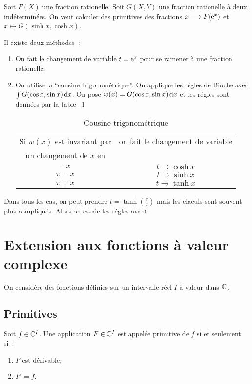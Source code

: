 Soit \(F(X)\) une fraction rationelle. Soit \(G(X,Y)\) une fraction rationelle à deux indéterminées. On veut calculer des primitives des fractions \(x \longmapsto F(\operatorname{e}^x)\) et \(x \longmapsto G(\sinh x,\cosh x)\).

Il existe deux méthodes~:
\begin{enumerate}
  \item On fait le changement de variable \(t=\operatorname{e}^x\) pour se ramener à une fraction rationelle;
  \item On utilise la ``cousine trigonométrique''. On applique les régles de Bioche avec \(\int G(\cos x,\sin x)\mathop{}\mathopen{}\mathrm{d} x\). On pose \(w(x) = G(\cos x,\sin x) \mathop{}\mathopen{}\mathrm{d} x\) et les régles sont données par la table~
    \ref{tab:cousinetrigo}

    \begin{table}[!h]
      \centering
      \begin{tabular}{|c|c|}\hline
        Si \(w(x)\) est invariant par & on fait le changement de variable \\
        un changement de \(x\) en &  \\ \hline
        \(-x\) & \(t \to \cosh x\)\\
        \(\pi-x\) & \(t \to \sinh x\)\\
        \(\pi+x\) & \(t \to \tanh x\)\\
      \hline\end{tabular}
      \caption{Cousine trigonométrique}
      \label{tab:cousinetrigo}
    \end{table}
\end{enumerate}

Dans tous les cas, on peut prendre \(t=\tanh\left(\frac{x}{2}\right)\) mais les claculs sont souvent plus compliqués. Alors on essaie les régles avant.

\section{Extension aux fonctions à valeur complexe}

On considère des fonctions définies sur un intervalle réel \(I\) à valeur dans \(\mathbb{C}\).

\subsection{Primitives}

\begin{defdef}
  Soit \(f \in \mathbb{C}^I\). Une application \(F \in \mathbb{C}^I\) est appelée primitive de \(f\) si et seulement si~:
  \begin{enumerate}
    \item \(F\) est dérivable;
    \item \(F'=f\).
  \end{enumerate}
\end{defdef}

